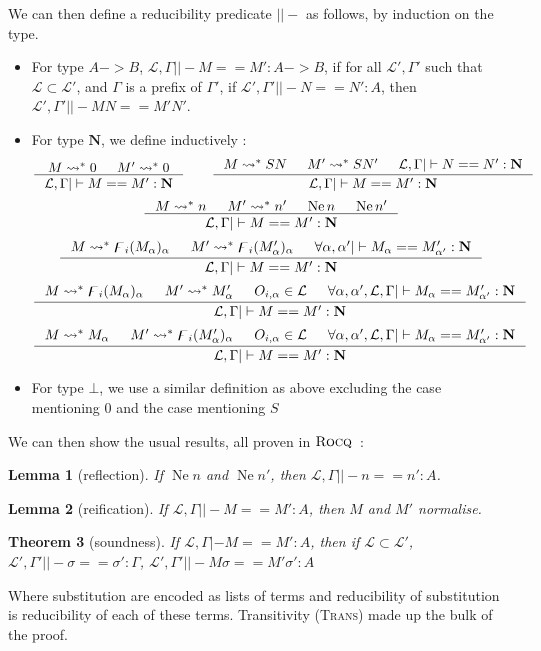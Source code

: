 \documentclass[11pt]{article}
\newtheorem{theorem}{Theorem}[section]
\newtheorem{lemma}[theorem]{Lemma}
\DeclareMathOperator{\neu}{Ne}
\newcommand{\0}{\mathbf{0}}
\newcommand{\1}{\mathbf{1}}
\newcommand{\nat}{\mathbf{N}}
\newcommand{\tctx}{\Gamma}
\newcommand{\fctx}{\mathcal{L}}
\begin{document}
We can then define a reducibility predicate $||-$ as follows, by induction on the type.
\begin{itemize}
    \item For type $A -> B$, $\fctx,\tctx ||- M == M' : A -> B$, if for all $\fctx',\tctx'$ such that $\fctx\subset\fctx'$, and $\tctx$ is a prefix of $\tctx'$, if $\fctx',\tctx' ||- N == N' : A$, then $\fctx', \tctx' ||- MN == M'N'$.
    \item For type $\nat$, we define inductively :
$$
    \inference{M \leadsto^\ast 0&M' \leadsto^\ast 0}{\fctx,\tctx ||- M == M' : \nat}\qquad
    \inference{M \leadsto^\ast SN&M' \leadsto^\ast SN' &\fctx,\tctx ||- N == N' : \nat}{\fctx,\tctx ||- M == M' : \nat}
$$
$$
    \inference{M \leadsto^\ast n&M' \leadsto^\ast n' &\neu n & \neu n'}{\fctx,\tctx ||- M == M' : \nat}
$$
$$
    \inference{M \leadsto^\ast \digamma_i (M_\alpha)_\alpha&M' \leadsto^\ast \digamma_i({M'_\alpha})_\alpha & \forall \alpha,\alpha' ||- M_\alpha == M'_{\alpha'} : \nat}{\fctx,\tctx ||- M == M' : \nat}
$$
$$
    \inference{M \leadsto^\ast \digamma_i(M_\alpha)_\alpha&M' \leadsto^\ast M'_\alpha & O_{i,\alpha}\in \fctx & \forall \alpha,\alpha', \fctx,\tctx ||- M_\alpha == M'_{\alpha'} : \nat}{\fctx,\tctx ||- M == M' : \nat}
$$
$$
    \inference{M \leadsto^\ast M_\alpha&M' \leadsto^\ast \digamma_i (M'_\alpha)_\alpha & O_{i,\alpha}\in \fctx & \forall \alpha,\alpha', \fctx,\tctx ||- M_\alpha == M'_{\alpha'} : \nat}{\fctx,\tctx ||- M == M' : \nat}
$$
    \item For type $\bot$, we use a similar definition as above excluding the case mentioning $0$ and the case mentioning $S$ 
\end{itemize}

We can then show the usual results, all proven in $\textsc{Rocq}$~:

\begin{lemma}[reflection]
    If $\neu n$ and $\neu n'$, then $\fctx,\tctx ||- n == n' : A$.
\end{lemma}
\begin{lemma}[reification]
    If $\fctx,\tctx ||- M == M' : A$, then $M$ and $M'$ normalise.
\end{lemma}

\begin{theorem}[soundness]
    If $\fctx,\tctx |- M == M' : A$, then if $\fctx \subset \fctx'$, $\fctx',\tctx'||-\sigma == \sigma' : \Gamma$, $\fctx',\tctx' ||- M\sigma == M'\sigma' : A$
\end{theorem}
Where substitution are encoded as lists of terms and reducibility of substitution is reducibility of each of these terms. Transitivity (\textsc{Trans}) made up the bulk of the proof.
\end{document}
